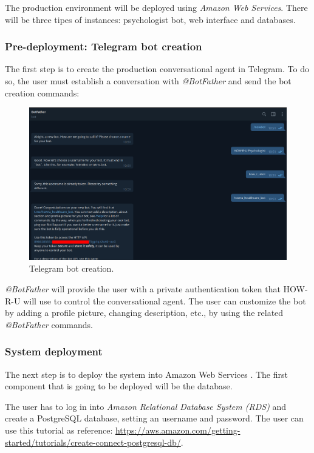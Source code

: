 \documentclass[12pt,english]{article}
\begin{document}
The production environment will be deployed using \emph{Amazon Web Services}. There will be three tipes of instances: psychologist bot, web interface and databases.

\subsubsection{Pre-deployment: Telegram bot creation}

The first step is to create the production conversational agent in Telegram. To do so, the user must establish a conversation with \emph{@BotFather} and send the bot creation commands:

\begin{figure}[H]
  \centering
  \includegraphics[width=\textwidth]{bot_creation.png}
  \caption{Telegram bot creation.}
\end{figure}

\emph{@BotFather} will provide the user with a private authentication token that HOW-R-U will use to control the conversational agent. The user can customize the bot by adding a profile picture, changing description, etc., by using the related \emph{@BotFather} commands.

\subsubsection{System deployment}

The next step is to deploy the system into Amazon Web Services \cite{aws}. The first component that is going to be deployed will be the database.

The user has to log in into \emph{Amazon Relational Database System (RDS)} and create a PostgreSQL database, setting an username and password. The user can use this tutorial as reference: \href{https://aws.amazon.com/getting-started/tutorials/create-connect-postgresql-db/}{https://aws.amazon.com/getting-started/tutorials/create-connect-postgresql-db/}.
\end{document}
